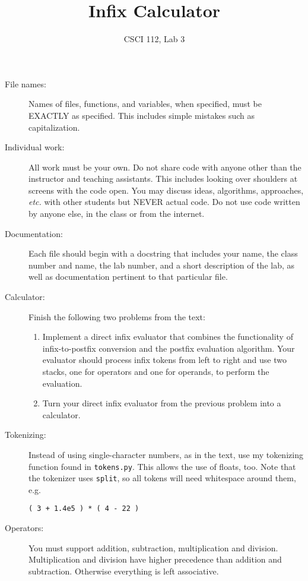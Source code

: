 \documentclass{article}
\title{Infix Calculator}
\author{CSCI 112, Lab 3}
\date{}
\begin{document}
\sloppy

\maketitle

\begin{description} 
\item[File names:]  Names of files, functions, and variables, 
when specified,
must be EXACTLY as specified.  This includes simple mistakes such
as capitalization.

\item[Individual work:]  All work must be your own.  Do not share
code with anyone other than the instructor and teaching assistants.
This includes looking over shoulders at screens with the code open.
You may discuss ideas, algorithms, approaches, {\em etc.} with
other students but NEVER actual code.  Do not use code
written by anyone else, in the class or from the internet.

\item[Documentation:] Each file should begin with a docstring
that includes your name, the class number and name, the lab
number, and  
a short description of the lab, as well as documentation pertinent
to that particular file.

\item[Calculator:] Finish the following two problems from the text:
\begin{enumerate}
\item
Implement a direct infix evaluator that combines the functionality of infix-to-postfix conversion and the postfix evaluation algorithm. Your evaluator should process infix tokens from left to right and use two stacks, one for operators and one for operands, to perform the evaluation.
\item
Turn your direct infix evaluator from the previous problem into a calculator.
\end{enumerate}

\item[Tokenizing:]  Instead of using single-character numbers, as in the text,
use my tokenizing function found in \lstinline{tokens.py}.  This allows the use
of floats, too.  Note that the tokenizer uses \lstinline{split}, so all tokens will need
whitespace around them, e.g.
\begin{lstlisting}
( 3 + 1.4e5 ) * ( 4 - 22 )
\end{lstlisting}

\item[Operators:] You must support addition, subtraction, multiplication
and division.  Multiplication and division have higher precedence than 
addition and subtraction.  Otherwise everything is left associative.


\end{description}
\end{document}
